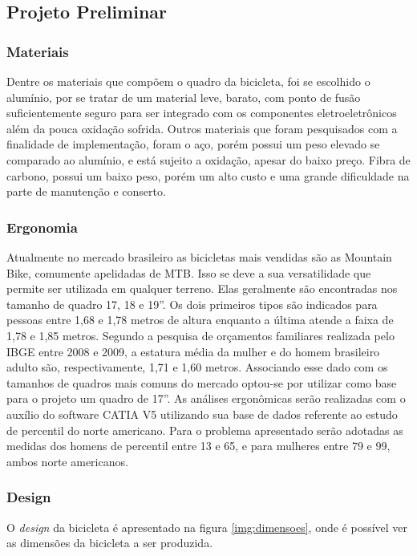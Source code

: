 	\subsection{Projeto Preliminar}
		\subsubsection{Materiais}
		Dentre os materiais que compõem o quadro da bicicleta, foi se escolhido o alumínio, por se tratar de um material leve, barato, com ponto de fusão suficientemente seguro para ser integrado com os componentes eletroeletrônicos além da pouca oxidação sofrida. Outros materiais que foram pesquisados com a finalidade de implementação, foram o aço, porém possui um peso elevado se comparado ao alumínio, e está sujeito a oxidação, apesar do baixo preço. Fibra de carbono, possui um baixo peso, porém um alto custo e uma grande dificuldade na parte de manutenção e conserto.
		
		\subsubsection{Ergonomia}
		Atualmente no mercado brasileiro as bicicletas mais vendidas são as Mountain Bike, comumente apelidadas de MTB. Isso se deve a sua versatilidade que permite ser utilizada em qualquer terreno. Elas geralmente são encontradas nos tamanho de quadro 17, 18 e 19”. Os dois primeiros tipos são indicados para pessoas entre 1,68 e 1,78 metros de altura enquanto a última atende a faixa de 1,78 e 1,85 metros. 
		Segundo a pesquisa de orçamentos familiares realizada pelo IBGE entre 2008 e 2009, a estatura média da mulher e do homem brasileiro adulto são, respectivamente, 1,71 e 1,60 metros. Associando esse dado com os tamanhos de quadros mais comuns do mercado optou-se por utilizar como base para o projeto um quadro de 17”.  
		As análises ergonômicas serão realizadas com o auxílio do software CATIA V5 utilizando sua base de dados referente ao estudo de percentil do norte americano. Para o problema apresentado serão adotadas as medidas dos homens de percentil entre 13 e 65, e para mulheres entre 79 e 99, ambos norte americanos.

		\subsubsection{Design}
	
		O \textit{design} da bicicleta é apresentado na figura \ref{img:dimensoes}, onde é possível ver as dimensões da bicicleta a ser produzida.	
		
